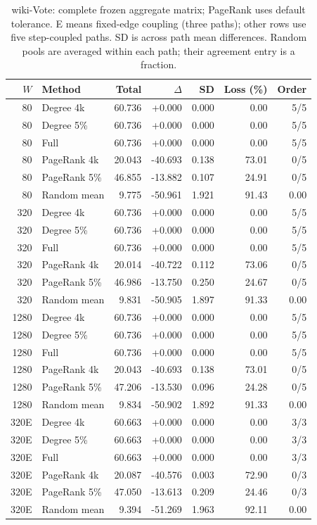 \begin{table}[htbp]
\caption{wiki-Vote: complete frozen aggregate matrix; PageRank uses default tolerance. E means fixed-edge coupling (three paths); other rows use five step-coupled paths. SD is across path mean differences. Random pools are averaged within each path; their agreement entry is a fraction.}\label{tab:s-wiki_vote}
\begin{tabular}{rlrrrrr}
\toprule
$W$ & Method & Total & $\Delta$ & SD & Loss (\%) & Order \\
\midrule
80 & Degree 4k & 60.736 & +0.000 & 0.000 & 0.00 & 5/5 \\
80 & Degree 5\% & 60.736 & +0.000 & 0.000 & 0.00 & 5/5 \\
80 & Full & 60.736 & +0.000 & 0.000 & 0.00 & 5/5 \\
80 & PageRank 4k & 20.043 & -40.693 & 0.138 & 73.01 & 0/5 \\
80 & PageRank 5\% & 46.855 & -13.882 & 0.107 & 24.91 & 0/5 \\
80 & Random mean & 9.775 & -50.961 & 1.921 & 91.43 & 0.00 \\
320 & Degree 4k & 60.736 & +0.000 & 0.000 & 0.00 & 5/5 \\
320 & Degree 5\% & 60.736 & +0.000 & 0.000 & 0.00 & 5/5 \\
320 & Full & 60.736 & +0.000 & 0.000 & 0.00 & 5/5 \\
320 & PageRank 4k & 20.014 & -40.722 & 0.112 & 73.06 & 0/5 \\
320 & PageRank 5\% & 46.986 & -13.750 & 0.250 & 24.67 & 0/5 \\
320 & Random mean & 9.831 & -50.905 & 1.897 & 91.33 & 0.00 \\
1280 & Degree 4k & 60.736 & +0.000 & 0.000 & 0.00 & 5/5 \\
1280 & Degree 5\% & 60.736 & +0.000 & 0.000 & 0.00 & 5/5 \\
1280 & Full & 60.736 & +0.000 & 0.000 & 0.00 & 5/5 \\
1280 & PageRank 4k & 20.043 & -40.693 & 0.138 & 73.01 & 0/5 \\
1280 & PageRank 5\% & 47.206 & -13.530 & 0.096 & 24.28 & 0/5 \\
1280 & Random mean & 9.834 & -50.902 & 1.892 & 91.33 & 0.00 \\
320E & Degree 4k & 60.663 & +0.000 & 0.000 & 0.00 & 3/3 \\
320E & Degree 5\% & 60.663 & +0.000 & 0.000 & 0.00 & 3/3 \\
320E & Full & 60.663 & +0.000 & 0.000 & 0.00 & 3/3 \\
320E & PageRank 4k & 20.087 & -40.576 & 0.003 & 72.90 & 0/3 \\
320E & PageRank 5\% & 47.050 & -13.613 & 0.209 & 24.46 & 0/3 \\
320E & Random mean & 9.394 & -51.269 & 1.963 & 92.11 & 0.00 \\
\bottomrule
\end{tabular}
\end{table}
